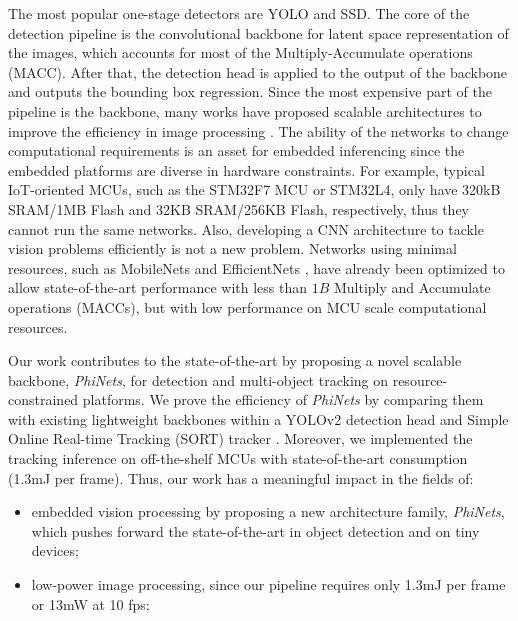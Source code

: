 The most popular one-stage detectors are YOLO and SSD. The core of the detection pipeline is the convolutional backbone for latent space representation of the images, which accounts for most of the Multiply-Accumulate operations (MACC). After that, the detection head is applied to the output of the backbone and outputs the bounding box regression.
Since the most expensive part of the pipeline is the backbone, many works have proposed scalable architectures to improve the efficiency in image processing \cite{howard2017mobilenets, tan2021efficientnetv2}. The ability of the networks to change computational requirements is an asset for embedded inferencing since the embedded platforms are diverse in hardware constraints. For example, typical IoT-oriented MCUs, such as the STM32F7 MCU or STM32L4, only have 320kB SRAM/1MB Flash and 32KB SRAM/256KB Flash, respectively, thus they cannot run the same networks. Also, developing a CNN architecture to tackle vision problems efficiently is not a new problem. Networks using minimal resources, such as MobileNets \cite{howard2017mobilenets} and EfficientNets \cite{tan2019efficientnet}, have already been optimized to allow state-of-the-art performance with less than $1B$ Multiply and Accumulate operations (MACCs), but with low performance on MCU scale computational resources.

Our work contributes to the state-of-the-art by proposing a novel scalable backbone,  \textit{PhiNets}, for detection and multi-object tracking on resource-constrained platforms. 
We prove the efficiency of \textit{PhiNets} by comparing them with existing lightweight backbones within a YOLOv2 \cite{redmon2017yolo9000} detection head and Simple Online Real-time Tracking (SORT) tracker \cite{bewley2016simple}.
Moreover, we implemented the tracking inference on off-the-shelf MCUs with state-of-the-art consumption (1.3mJ per frame).
Thus, our work has a meaningful impact in the fields of:
\begin{itemize}
\item embedded vision processing by proposing a new architecture family, \textit{PhiNets}, which pushes forward the state-of-the-art in object detection and  on tiny devices;
\item low-power image processing, since our pipeline requires only 1.3mJ per frame or 13mW at 10 fps;
\end{itemize}